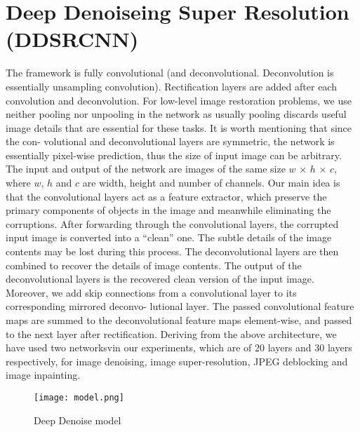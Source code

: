 \section{Deep Denoiseing Super Resolution (DDSRCNN)}

The framework is fully convolutional (and deconvolutional. Deconvolution is essentially unsampling convolution). Rectification layers are added after each convolution and deconvolution. For low-level image restoration problems, we use neither pooling nor unpooling in the network as usually pooling discards useful image details that are essential for these tasks. It is worth mentioning that since the con- volutional and deconvolutional layers are symmetric, the network is essentially pixel-wise prediction, thus the size of input image can be arbitrary. The input and output of the network are images of the same size $w$ × $h$ × $c$, where $w$, $h$ and $c$ are width, height and number of channels.
Our main idea is that the convolutional layers act as a feature extractor, which preserve the primary components of objects in the image and meanwhile eliminating the corruptions. After forwarding through the convolutional layers, the corrupted input image is converted into a “clean” one. The subtle details of the image contents may be lost during this process. The deconvolutional layers are then combined to recover the details of image contents. The output of the deconvolutional layers is the recovered clean version of the input image. Moreover, we add skip connections from a convolutional layer to its corresponding mirrored deconvo- lutional layer. The passed convolutional feature maps are summed to the deconvolutional feature maps element-wise, and passed to the next layer after rectification. Deriving from the above architecture, we have used two networksvin our experiments, which are of 20 layers and 30 layers respectively, for image denoising, image super-resolution, JPEG deblocking and image inpainting.
\begin{figure}[htb]
    \centering
    \texttt{[image: model.png]}
    \caption{Deep Denoise model}
    \label{fig:modeldd}
\end{figure}
